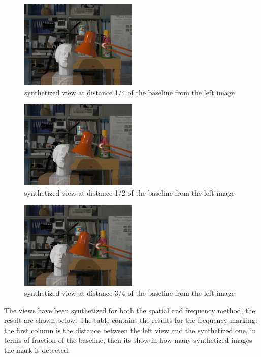 \begin{figure}[h!]
\centering
\includegraphics[width=0.5\textwidth]{./img/synth_view1_25.png}
\caption{\small{synthetized view at distance 1/4 of the baseline from the left image }}
\label{fig:synt1/4}
\end{figure}
\begin{figure}[h!]
\centering
\includegraphics[width=0.5\textwidth]{./img/synth_view1_50.png}
\caption{\small{synthetized view at distance 1/2 of the baseline from the left image }}
\label{fig:synt1/2}
\end{figure}
\begin{figure}[h!]
\centering
\includegraphics[width=0.5\textwidth]{./img/synth_view1_75.png}
\caption{\small{synthetized view at distance 3/4 of the baseline from the left image }}
\label{fig:synt3/4}
\end{figure}
The views have been synthetized for both the spatial and frequency method, the result are shown below.\newline
The table contains the results for the frequency marking: the first column is the distance between the left view and the synthetized one, in terms of fraction of the baseline, then its show in how many synthetized images the mark is detected.

